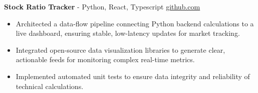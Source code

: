 \documentclass[11pt]{article}       %
\begin{document}

\textbf{Stock Ratio Tracker}{ - Python, React, Typescript} \hfill \href{https://github.com/Monica20030707/tradingDashboard-UI}{github.com} \\
\vspace{-9pt}
\begin{itemize}
  \item Architected a data-flow pipeline connecting Python backend calculations to a live dashboard, ensuring stable, low-latency updates for market tracking. 
  \item Integrated open-source data visualization libraries to generate clear, actionable feeds for monitoring complex real-time metrics.
  \item Implemented automated unit tests to ensure data integrity and reliability of technical calculations.
\end{itemize}

\end{document}
